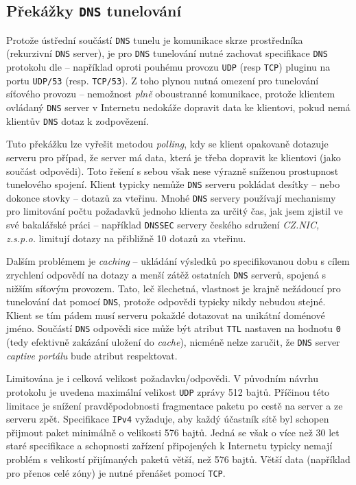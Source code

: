 \documentclass[thesis=M,czech]{FITthesis}[2012/10/20]
\begin{document}
    \subsection{Překážky \texttt{DNS} tunelování}

    Protože ústřední součástí \texttt{DNS} tunelu je komunikace skrze prostředníka (rekurzivní \texttt{DNS} server), je pro \texttt{DNS} tunelování nutné zachovat specifikace \texttt{DNS} protokolu dle \cite[RFC 1035]{rfc1035} -- například oproti pouhému provozu \texttt{UDP} (resp \texttt{TCP}) pluginu na portu \texttt{UDP/53} (resp. \texttt{TCP/53}). Z toho plynou nutná omezení pro tunelování síťového provozu -- nemožnost \textit{plně} oboustranné komunikace, protože klientem ovládaný \texttt{DNS} server v Internetu nedokáže dopravit data ke klientovi, pokud nemá klientův \texttt{DNS} dotaz k zodpovězení.
    
    Tuto překážku lze vyřešit metodou \textit{polling}, kdy se klient opakovaně dotazuje serveru pro případ, že server má data, která je třeba dopravit ke klientovi (jako součást odpovědi). Toto řešení s sebou však nese výrazně sníženou prostupnost tunelového spojení. Klient typicky nemůže \texttt{DNS} serveru pokládat desítky -- nebo dokonce stovky -- dotazů za vteřinu. Mnohé \texttt{DNS} servery používají mechanismy pro limitování počtu požadavků jednoho klienta za určitý čas, jak jsem zjistil ve své bakalářské práci \cite{moje-bakalarka} -- například \texttt{DNSSEC} servery českého sdružení \textit{CZ.NIC, z.s.p.o.}\cite{cznic-dnssec} limitují dotazy na přibližně 10 dotazů za vteřinu.
    
    Dalším problémem je \textit{caching} -- ukládání výsledků po specifikovanou dobu s cílem zrychlení odpovědí na dotazy a menší zátěž ostatních \texttt{DNS} serverů, spojená s nižším síťovým provozem. Tato, leč šlechetná, vlastnost je krajně nežádoucí pro tunelování dat pomocí \texttt{DNS}, protože odpovědi typicky nikdy nebudou stejné. Klient se tím pádem musí serveru pokaždé dotazovat na unikátní doménové jméno. Součástí \texttt{DNS} odpovědi sice může být atribut \texttt{TTL} nastaven na hodnotu \texttt{0} (tedy efektivně zakázání uložení do \textit{cache}), nicméně nelze zaručit, že \texttt{DNS} server \textit{captive portálu} bude atribut respektovat.
    
    Limitována je i celková velikost požadavku/odpovědi. V původním návrhu protokolu \cite[RFC 1035]{rfc1035} je uvedena maximální velikost \texttt{UDP} zprávy 512 bajtů. Příčinou této limitace je snížení pravděpodobnosti fragmentace paketu po cestě na server a ze serveru zpět. Specifikace \texttt{IPv4} \cite[RFC 791]{rfc791} vyžaduje, aby každý účastník sítě byl schopen přijmout paket minimálně o velikosti 576 bajtů. Jedná se však o více než 30 let staré specifikace a schopnosti zařízení připojených k Internetu typicky nemají problém s velikostí přijímaných paketů větší, než 576 bajtů. Větší data (například pro přenos celé zóny) je nutné přenášet pomocí \texttt{TCP}.
    
\end{document}
